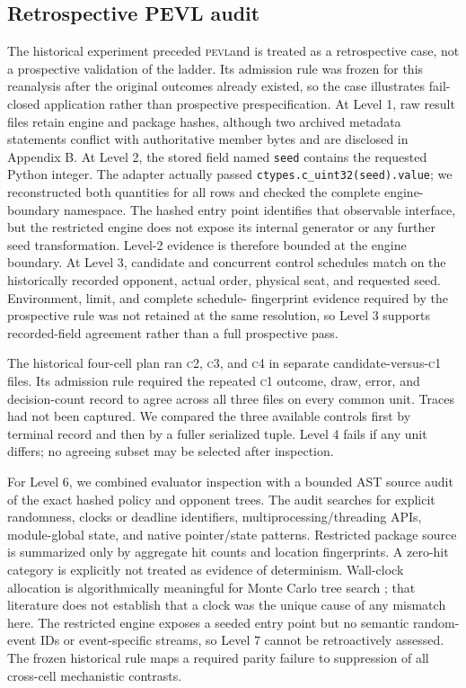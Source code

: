 \documentclass[aps,reprint,superscriptaddress,longbibliography,floatfix]{revtex4-2}
\newcommand{\PEVL}{\textsc{pevl}}
\newcommand{\COne}{\textsc{c1}}
\newcommand{\CTwo}{\textsc{c2}}
\newcommand{\CThree}{\textsc{c3}}
\newcommand{\CFour}{\textsc{c4}}
\begin{document}
\subsection{Retrospective PEVL audit}

The historical experiment preceded \PEVL and is treated as a retrospective
case, not a prospective validation of the ladder.  Its admission rule was frozen
for this reanalysis after the original outcomes already existed, so the case
illustrates fail-closed application rather than prospective prespecification.
At Level 1, raw result files
retain engine and package hashes, although two archived metadata statements
conflict with authoritative member bytes and are disclosed in Appendix B.  At
Level 2, the stored field named \texttt{seed} contains the requested Python
integer.  The adapter actually passed
\texttt{ctypes.c\_uint32(seed).value}; we reconstructed both quantities for all
rows and checked the complete engine-boundary namespace.  The hashed entry point
identifies that observable interface, but the restricted engine does not expose
its internal generator or any further seed transformation.  Level-2 evidence is
therefore bounded at the engine boundary.  At Level 3, candidate and concurrent
control schedules match on the historically recorded opponent, actual order,
physical seat, and requested seed.  Environment, limit, and complete schedule-
fingerprint evidence required by the prospective rule was not retained at the
same resolution, so Level 3 supports recorded-field agreement rather than a full
prospective pass.

The historical four-cell plan ran \CTwo{}, \CThree{}, and \CFour{} in separate
candidate-versus-\COne{} files.  Its admission rule required the repeated
\COne{} outcome, draw, error, and decision-count record to agree across all
three files on every common unit.  Traces had not been captured.  We compared
the three available controls first by terminal record and then by a fuller
serialized tuple.  Level 4 fails if any unit differs; no agreeing subset may be
selected after inspection.

For Level 6, we combined evaluator inspection with a bounded AST source audit
of the exact hashed policy and opponent trees.  The audit searches for explicit
randomness, clocks or deadline identifiers, multiprocessing/threading APIs,
module-global state, and native pointer/state patterns.  Restricted package
source is summarized only by aggregate hit counts and location fingerprints.
A zero-hit category is explicitly not treated as evidence of determinism.
Wall-clock allocation is algorithmically meaningful for Monte Carlo tree search
\cite{baier2016timemanagement}; that literature does not establish that a clock
was the unique cause of any mismatch here.  The restricted engine exposes a
seeded entry point but no semantic random-event IDs or event-specific streams,
so Level 7 cannot be retroactively assessed.  The frozen historical rule maps a
required parity failure to suppression of all cross-cell mechanistic contrasts.
\end{document}
